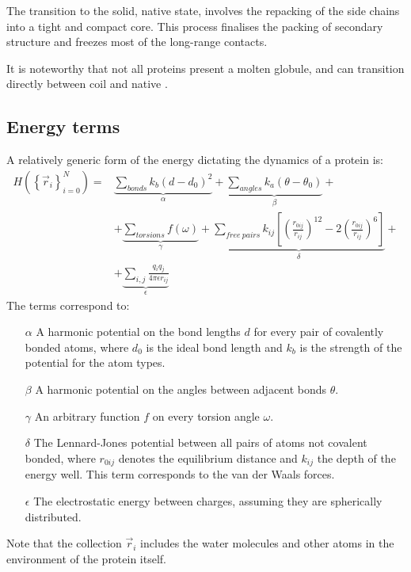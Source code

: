 The transition to the solid, native state, involves the repacking of the side chains into a tight and compact core.
This process finalises the packing of secondary structure and freezes most of the long-range contacts.

It is noteworthy 
that not all proteins present a molten globule, and can transition directly between coil and native \citep{protein_physics}.


\subsection{Energy terms}
A relatively generic form of the energy dictating the dynamics of a protein is:
\begin{align*}
H(\left\{\vec r_i\right\}_{i=0}^N) =& \underbrace{\sum_{bonds} k_b \left(d - d_0\right)^2}_\alpha + 
\underbrace{\sum_{angles} k_a \left(\theta - \theta_0\right)}_\beta +  \nonumber \\
&+ \underbrace{\sum_{torsions} f\left(\omega\right)}_\gamma +
\underbrace{\sum_{free\ pairs} k_{ij} \left[\left(\frac{r_{0ij}}{r_{ij}}\right)^{12} - 2 \left(\frac{r_{0ij}}{r_{ij}}\right)^{6} \right]}_\delta + \nonumber \\
&+ \underbrace{\sum_{i,j} \frac{q_i q_j}{4 \pi \epsilon r_{ij}}}_\epsilon
\end{align*}
The terms correspond to:

\begin{itemize}
\item[$\alpha$] A harmonic potential on the bond lengths $d$ for every pair of covalently bonded atoms, where $d_0$ is the ideal bond length and $k_b$ is the strength of the potential for the atom types.
\item[$\beta$] A harmonic potential on the angles between adjacent bonds $\theta$.
\item[$\gamma$] An arbitrary function $f$ on every torsion angle $\omega$.
\item[$\delta$] The Lennard-Jones potential between all pairs of atoms not covalent bonded, where $r_{0ij}$ denotes the equilibrium distance and $k_{ij}$ the depth of the energy well.
This term corresponds to the van der Waals forces.
\item[$\epsilon$] The electrostatic energy between charges, assuming they are spherically distributed.
\end{itemize}

Note that the collection $\vec r_i$ %
includes the water molecules and other atoms in the environment of the protein itself.

